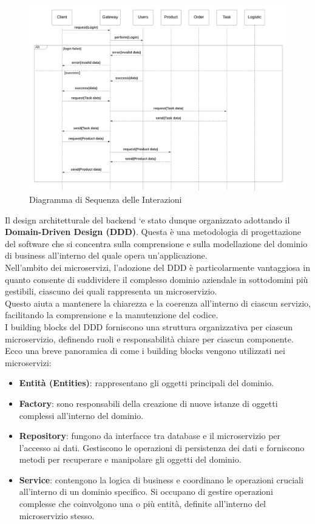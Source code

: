 \begin{figure}[H]
    \centering
    \includegraphics[width=\textwidth]{document/sections/img/sequenceDiagram.png}
    \caption{Diagramma di Sequenza delle Interazioni}
    \label{fig:sequenceDiagram}
\end{figure}
Il design architetturale del backend `e stato dunque organizzato adottando il \textbf{Domain-Driven Design (DDD)}.
Questa è una metodologia di progettazione del software che si concentra sulla comprensione e sulla modellazione
del dominio di business all'interno del quale opera un'applicazione.\\ Nell'ambito dei microservizi,
l'adozione del DDD è particolarmente vantaggiosa in quanto consente di suddividere il complesso dominio
aziendale in sottodomini più gestibili, ciascuno dei quali rappresenta un microservizio.\\ Questo aiuta a
mantenere la chiarezza e la coerenza all'interno di ciascun servizio, facilitando la comprensione e la
manutenzione del codice.\\
I building blocks del DDD forniscono una struttura organizzativa per ciascun microservizio,
definendo ruoli e responsabilità chiare per ciascun componente.\\ Ecco una breve panoramica di come i building
blocks vengono utilizzati nei microservizi:

\begin{itemize}
    \item \textbf{Entità (Entities)}: rappresentano gli oggetti principali del dominio.
    \item \textbf{Factory}: sono responsabili della creazione di nuove istanze di oggetti complessi all'interno del dominio.
    \item \textbf{Repository}: fungono da interfacce tra database e il microservizio per l'accesso ai dati. Gestiscono le operazioni di persistenza dei dati e forniscono metodi per recuperare e manipolare gli oggetti del dominio.
    \item \textbf{Service}: contengono la logica di business e coordinano le operazioni cruciali all'interno di un dominio specifico. Si occupano di gestire operazioni complesse che coinvolgono una o più entità, definite all'interno del microservizio stesso.
\end{itemize}

